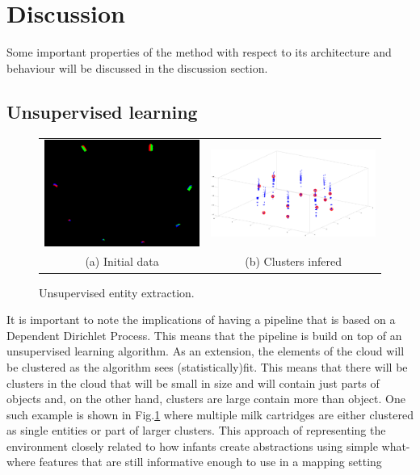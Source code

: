 \documentclass[twoside,hidelinks]{article}
\begin{document}
\newpage
\section{Discussion}
\label{sec:discussion}

    Some important properties of the method with respect to its architecture and behaviour will be discussed in the discussion section.
    
    \subsection{Unsupervised learning}

\begin{figure}
\begin{tabular}{cc}
    \includegraphics[width=.5\textwidth]{8boxesData} &  \includegraphics[width=.5\textwidth]{8boxes} \\
  (a) Initial data  & (b) Clusters infered \\[6pt]
\end{tabular}
\caption{Unsupervised entity extraction.}
  \label{pip:beh}
\end{figure}


It is important to note the implications of having a pipeline that is based on a Dependent Dirichlet Process. This means that the pipeline is build on top of an unsupervised learning algorithm. As an extension, the elements of the cloud will be clustered as the algorithm sees (statistically)fit. This means that there will be clusters in the cloud that will be small in size and will contain just parts of objects and, on the other hand, clusters are large contain more than object. One such example is shown in Fig.\ref{pip:beh} where multiple milk cartridges are either clustered as single entities or part of larger clusters. This approach of representing the environment closely related to how infants create abstractions using simple what-where features\cite{infants} that are still informative enough to use in a mapping setting
\end{document}
